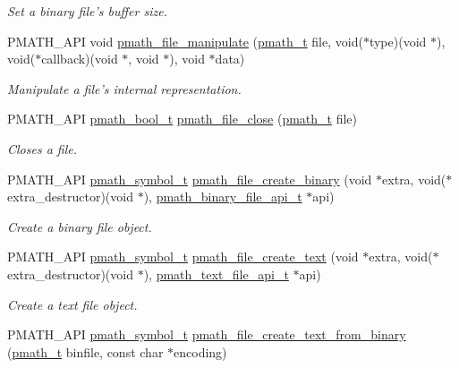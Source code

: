 \begin{CompactItemize}
\begin{CompactList}\small\item\em Set a binary file's buffer size. \item\end{CompactList}\item 
PMATH\_\-API void \hyperlink{group__file__api_ga286dc02f8ee28ee0b3fcfa302ae7982}{pmath\_\-file\_\-manipulate} (\hyperlink{classpmath__t}{pmath\_\-t} file, void($\ast$type)(void $\ast$), void($\ast$callback)(void $\ast$, void $\ast$), void $\ast$data)
\begin{CompactList}\small\item\em Manipulate a file's internal representation. \item\end{CompactList}\item 
PMATH\_\-API \hyperlink{group__general__types_gc92090cb0b56345d6c379ed2341d4ef4}{pmath\_\-bool\_\-t} \hyperlink{group__file__api_g61142920bd7a8f066af908092c84d8e4}{pmath\_\-file\_\-close} (\hyperlink{classpmath__t}{pmath\_\-t} file)
\begin{CompactList}\small\item\em Closes a file. \item\end{CompactList}\item 
PMATH\_\-API \hyperlink{classpmath__symbol__t}{pmath\_\-symbol\_\-t} \hyperlink{group__file__api_g121e1c31d32fa30b60c8bb4d0808f4eb}{pmath\_\-file\_\-create\_\-binary} (void $\ast$extra, void($\ast$extra\_\-destructor)(void $\ast$), \hyperlink{structpmath__binary__file__api__t}{pmath\_\-binary\_\-file\_\-api\_\-t} $\ast$api)
\begin{CompactList}\small\item\em Create a binary file object. \item\end{CompactList}\item 
PMATH\_\-API \hyperlink{classpmath__symbol__t}{pmath\_\-symbol\_\-t} \hyperlink{group__file__api_gb8a4394b083543a3e572862d567b4b63}{pmath\_\-file\_\-create\_\-text} (void $\ast$extra, void($\ast$extra\_\-destructor)(void $\ast$), \hyperlink{structpmath__text__file__api__t}{pmath\_\-text\_\-file\_\-api\_\-t} $\ast$api)
\begin{CompactList}\small\item\em Create a text file object. \item\end{CompactList}\item 
PMATH\_\-API \hyperlink{classpmath__symbol__t}{pmath\_\-symbol\_\-t} \hyperlink{group__file__api_gc6f1960c7c529c1dac9feb97cf795a1c}{pmath\_\-file\_\-create\_\-text\_\-from\_\-binary} (\hyperlink{classpmath__t}{pmath\_\-t} binfile, const char $\ast$encoding)

\end{CompactItemize}
